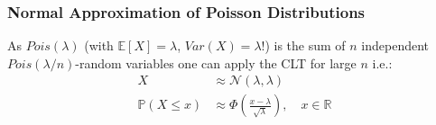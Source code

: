\subsubsection{Normal Approximation of Poisson Distributions}
As $Pois(\lambda)$ (with $\mathbb{E}[X]=\lambda$, $Var(X)=\lambda$!) is the sum of $n$ independent $Pois(\lambda/n)$-random variables one can apply the CLT for large $n$ i.e.:
\begin{align*}
    X                   & \approx\mathcal{N}(\lambda, \lambda)                                           \\
    \mathbb{P}(X\leq x) & \approx\Phi\left(\frac{x-\lambda}{\sqrt{\lambda}}\right),\quad x\in\mathbb{R}
\end{align*}
